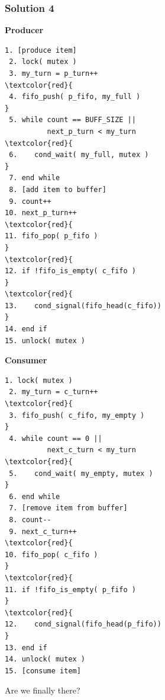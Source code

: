 \begin{frame}[fragile]
	\frametitle{Solution 4}

	\begin{multicols}{2}
		\footnotesize
		\textbf{Producer}
		\begin{Verbatim}[commandchars=\\\{\}]
 1. [produce item]
 2. lock( mutex )
 3. my_turn = p_turn++
\textcolor{red}{
 4. fifo_push( p_fifo, my_full )
}
 5. while count == BUFF_SIZE ||
          next_p_turn < my_turn
\textcolor{red}{
 6.    cond_wait( my_full, mutex )
}
 7. end while
 8. [add item to buffer]
 9. count++
10. next_p_turn++
\textcolor{red}{
11. fifo_pop( p_fifo )
}
\textcolor{red}{
12. if !fifo_is_empty( c_fifo )
}
\textcolor{red}{
13.    cond_signal(fifo_head(c_fifo))
}
14. end if
15. unlock( mutex )
		\end{Verbatim}
		\columnbreak
		\textbf{Consumer}\vspace{-2em}
		\begin{Verbatim}[commandchars=\\\{\}]
 1. lock( mutex )
 2. my_turn = c_turn++
\textcolor{red}{
 3. fifo_push( c_fifo, my_empty )
}
 4. while count == 0 ||
          next_c_turn < my_turn
\textcolor{red}{
 5.    cond_wait( my_empty, mutex )
}
 6. end while
 7. [remove item from buffer]
 8. count--
 9. next_c_turn++
\textcolor{red}{
10. fifo_pop( c_fifo )
}
\textcolor{red}{
11. if !fifo_is_empty( p_fifo )
}
\textcolor{red}{
12.    cond_signal(fifo_head(p_fifo))
}
13. end if
14. unlock( mutex )
15. [consume item]
		\end{Verbatim}
	\end{multicols}
	\vspace{-2em}

	Are we finally there?
\end{frame}



